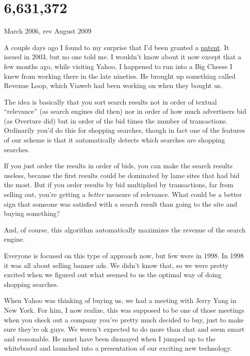 \chapter{6,631,372}

March 2006, rev August 2009

A couple days ago I found to my surprise that I'd been granted a
\href{http://patft.uspto.gov/netacgi/nph-Parser?Sect1=PTO1&Sect2=HITOFF&d=PALL&p=1&u=\%2Fnetahtml\%2FPTO\%2Fsrchnum.htm&r=1&f=G&l=50&s1=6,631,372.PN.&OS=PN/6,631,372&RS=PN/6,631,372}{patent}.
It issued in 2003, but no one told me. I wouldn't know about it now
except that a few months ago, while visiting Yahoo, I happened to run
into a Big Cheese I knew from working there in the late nineties. He
brought up something called Revenue Loop, which Viaweb had been working
on when they bought us.

The idea is basically that you sort search results not in order of
textual ``relevance'' (as search engines did then) nor in order of how
much advertisers bid (as Overture did) but in order of the bid times the
number of transactions. Ordinarily you'd do this for shopping searches,
though in fact one of the features of our scheme is that it
automatically detects which searches are shopping searches.

If you just order the results in order of bids, you can make the search
results useless, because the first results could be dominated by lame
sites that had bid the most. But if you order results by bid multiplied
by transactions, far from selling out, you're getting a \emph{better}
measure of relevance. What could be a better sign that someone was
satisfied with a search result than going to the site and buying
something?

And, of course, this algorithm automatically maximizes the revenue of
the search engine.

Everyone is focused on this type of approach now, but few were in 1998.
In 1998 it was all about selling banner ads. We didn't know that, so we
were pretty excited when we figured out what seemed to us the optimal
way of doing shopping searches.

When Yahoo was thinking of buying us, we had a meeting with Jerry Yang
in New York. For him, I now realize, this was supposed to be one of
those meetings when you check out a company you've pretty much decided
to buy, just to make sure they're ok guys. We weren't expected to do
more than chat and seem smart and reasonable. He must have been dismayed
when I jumped up to the whiteboard and launched into a presentation of
our exciting new technology.

